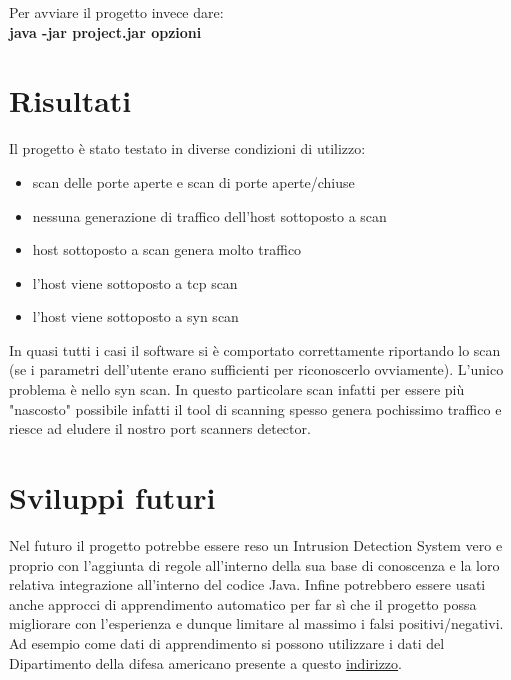 \documentclass[a4paper,12pt]{article} %
\begin{document}
Per avviare il progetto invece dare:\\

\textbf{java -jar project.jar opzioni}





\section{Risultati}

Il progetto è stato testato in diverse condizioni di utilizzo:

\begin{itemize}
\item scan delle porte aperte e scan di porte aperte/chiuse
\item nessuna generazione di traffico dell'host sottoposto a scan
\item host sottoposto a scan genera molto traffico
\item l'host viene sottoposto a tcp scan  
\item l'host viene sottoposto a syn scan 

\end{itemize}



In quasi tutti i casi il software si è comportato correttamente riportando lo scan (se i parametri dell'utente erano sufficienti
per riconoscerlo ovviamente). L'unico problema è nello syn scan. In questo particolare scan infatti per essere più "nascosto"
possibile infatti il tool di scanning spesso genera pochissimo traffico e riesce ad eludere il nostro port scanners detector.









\section{Sviluppi futuri}


Nel futuro il progetto potrebbe essere reso un Intrusion Detection System vero e proprio con l'aggiunta
di regole all'interno della sua base di conoscenza e la loro relativa integrazione all'interno del codice
Java. Infine potrebbero essere usati anche approcci di apprendimento automatico per far sì che il progetto
possa migliorare con l'esperienza e dunque limitare al massimo i falsi positivi/negativi. Ad esempio
come dati di apprendimento si possono utilizzare i dati del Dipartimento della difesa americano presente 
a questo \href{http://www.ll.mit.edu/mission/communications/ist/corpora/ideval/data/index.html}{indirizzo}. 
\end{document}
